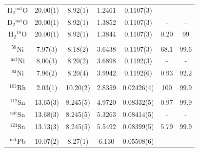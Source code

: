 \begin{table}[ht]
\begin{center}
\begin{tabular}{ c c c c c c c }
            H$_{2}$$^{\text{nat}}$O & 20.00(1) & 8.92(1) & 1.2461 & 0.1107(3) & - &
            - \\
            D$_{2}$$^{\text{nat}}$O & 20.00(1) & 8.92(1) & 1.3852 & 0.1107(3) & - &
            - \\
            H$_{2}$$^{18}$O & 20.00(1) & 8.92(1) & 1.3844 & 0.1107(3) & 0.20 & 99\\
            \\
            $^{58}$Ni & 7.97(3)& 8.18(2) &
            3.6438 & 0.1197(3)& 68.1 & 99.6 \\
            $^{\text{nat}}$Ni & 8.00(3) & 8.20(2) &
            3.6898 & 0.1192(3)& - & -\\
            $^{64}$Ni & 7.96(2) & 8.20(4) &
            3.9942 & 0.1192(6) & 0.93 & 92.2\\
            \\
            $^{103}$Rh & 2.03(1) & 10.20(2) & 2.8359 & 0.02426(4) & 100 & 99.9\\
            \\
            $^{112}$Sn & 13.65(3) & 8.245(5) &
            4.9720 & 0.08332(5) & 0.97 & 99.9\\
            $^{\text{nat}}$Sn & 13.68(3) & 8.245(5) &
            5.3263 & 0.08414(5) & - & -\\
            $^{124}$Sn & 13.73(3) & 8.245(5) &
            5.5492 & 0.08399(5) & 5.79 & 99.9\\
            \\
            $^{\text{nat}}$Pb & 10.07(2) & 8.27(1) & 6.130 &
            0.05508(6) & - & -\\
            \hline
        \end{tabular}
    \end{center}
\end{table}

